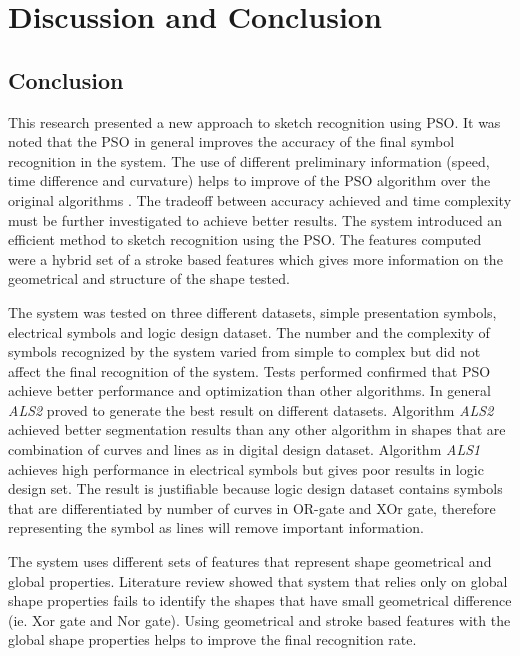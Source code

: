 \chapter{Discussion and Conclusion}
\label{sec:DiscussionConclusion}

\section{Conclusion}
\label{sec:ConclusionConclusion}

This research presented a new approach to sketch recognition using PSO. It was noted that the PSO in general improves the accuracy of the final symbol recognition in the system. The use of different preliminary information (speed, time difference and curvature)  helps to improve of the PSO algorithm over the original algorithms \cite{CruveDivisionSwarm,PolygonApproximationPSO}. The tradeoff between accuracy achieved and time complexity must be further investigated to achieve better results.  The system introduced an efficient method to sketch recognition using the PSO. The features computed were a hybrid set of a stroke based features which gives more information on the geometrical and structure of the shape tested.  

The system was tested on three different datasets, simple presentation symbols, electrical symbols and logic design dataset. The number and the complexity of symbols recognized by the system varied from simple to complex but did not affect the final recognition of the system. Tests performed confirmed that PSO achieve better performance and optimization than other algorithms. In general \textsl{ALS2} proved to generate the best result on different datasets. Algorithm \textsl{ALS2} achieved better segmentation results than any other algorithm in shapes that are combination of curves and lines as in digital design dataset. Algorithm \textsl{ALS1} achieves high performance in electrical symbols but gives poor results in logic design set. The result is justifiable because logic design dataset contains symbols that are differentiated by number of curves in OR-gate and XOr gate, therefore representing the symbol as lines will remove important information. 

The system uses different sets of features that represent shape geometrical and global properties. Literature review showed that system that relies only on global shape properties fails to identify the shapes that have small geometrical difference (ie. Xor gate and Nor gate). Using geometrical and stroke based features with the global shape properties helps to improve the final recognition rate.     



